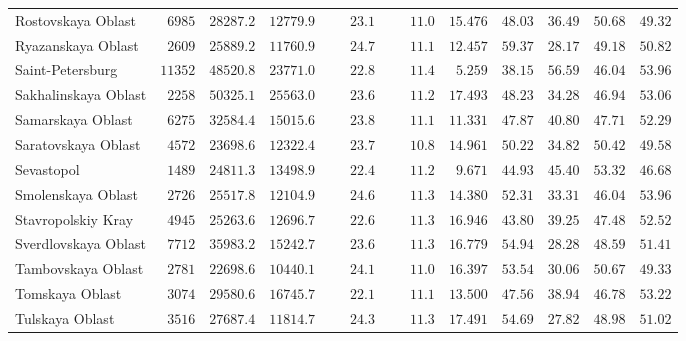 \documentclass[12pt,a4paper]{article}
\numberwithin{equation}{section}
\begin{document}
{\begin{longtable}{lcccccccccc}
		Rostovskaya Oblast  & $\phantom{0}6985$ & $28287.2$ & $12779.9$ & $\phantom{000}23.1$ & $\phantom{000}11.0$ & $15.476$ & $48.03$ & $36.49$ & $50.68$ & $49.32$ \\
		Ryazanskaya Oblast  & $\phantom{0}2609$ & $25889.2$ & $11760.9$ & $\phantom{000}24.7$ & $\phantom{000}11.1$ & $12.457$ & $59.37$ & $28.17$ & $49.18$ & $50.82$ \\
		Saint-Petersburg  & $11352$ & $48520.8$ & $23771.0$ & $\phantom{000}22.8$ & $\phantom{000}11.4$ & $\phantom{0}5.259$ & $38.15$ & $56.59$ & $46.04$ & $53.96$ \\
		Sakhalinskaya Oblast  & $\phantom{0}2258$ & $50325.1$ & $25563.0$ & $\phantom{000}23.6$ & $\phantom{000}11.2$ & $17.493$ & $48.23$ & $34.28$ & $46.94$ & $53.06$ \\
		Samarskaya Oblast  & $\phantom{0}6275$ & $32584.4$ & $15015.6$ & $\phantom{000}23.8$ & $\phantom{000}11.1$ & $11.331$ & $47.87$ & $40.80$ & $47.71$ & $52.29$ \\
		Saratovskaya Oblast  & $\phantom{0}4572$ & $23698.6$ & $12322.4$ & $\phantom{000}23.7$ & $\phantom{000}10.8$ & $14.961$ & $50.22$ & $34.82$ & $50.42$ & $49.58$ \\
		Sevastopol  & $\phantom{0}1489$ & $24811.3$ & $13498.9$ & $\phantom{000}22.4$ & $\phantom{000}11.2$ & $\phantom{0}9.671$ & $44.93$ & $45.40$ & $53.32$ & $46.68$ \\
		Smolenskaya Oblast  & $\phantom{0}2726$ & $25517.8$ & $12104.9$ & $\phantom{000}24.6$ & $\phantom{000}11.3$ & $14.380$ & $52.31$ & $33.31$ & $46.04$ & $53.96$ \\
		Stavropolskiy Kray  & $\phantom{0}4945$ & $25263.6$ & $12696.7$ & $\phantom{000}22.6$ & $\phantom{000}11.3$ & $16.946$ & $43.80$ & $39.25$ & $47.48$ & $52.52$ \\
		Sverdlovskaya Oblast  & $\phantom{0}7712$ & $35983.2$ & $15242.7$ & $\phantom{000}23.6$ & $\phantom{000}11.3$ & $16.779$ & $54.94$ & $28.28$ & $48.59$ & $51.41$ \\
		Tambovskaya Oblast  & $\phantom{0}2781$ & $22698.6$ & $10440.1$ & $\phantom{000}24.1$ & $\phantom{000}11.0$ & $16.397$ & $53.54$ & $30.06$ & $50.67$ & $49.33$ \\
		Tomskaya Oblast  & $\phantom{0}3074$ & $29580.6$ & $16745.7$ & $\phantom{000}22.1$ & $\phantom{000}11.1$ & $13.500$ & $47.56$ & $38.94$ & $46.78$ & $53.22$ \\
		Tulskaya Oblast  & $\phantom{0}3516$ & $27687.4$ & $11814.7$ & $\phantom{000}24.3$ & $\phantom{000}11.3$ & $17.491$ & $54.69$ & $27.82$ & $48.98$ & $51.02$ \\

\end{longtable}}
\end{document}
